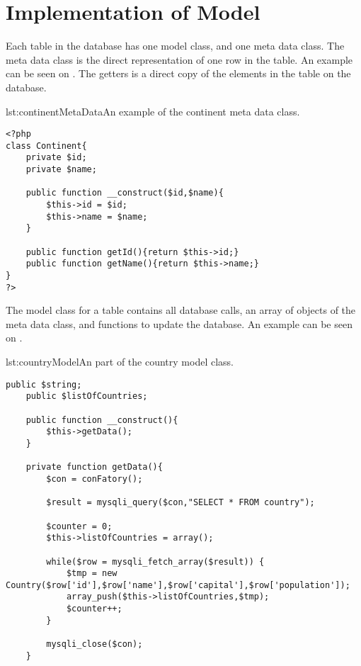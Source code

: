 \section{Implementation of Model}
Each table in the database has one model class, and one meta data class. The meta data class is the direct representation of one row in the table. An example can be seen on . The getters is a direct copy of the elements in the table on the database.

\begin{code}{lst:continentMetaData}{An example of the continent meta data class.}
\begin{lstlisting}
<?php
class Continent{
	private $id;
	private $name;
	
	public function __construct($id,$name){
		$this->id = $id;
		$this->name = $name;
	}
	
	public function getId(){return $this->id;}
	public function getName(){return $this->name;}
}
?>
\end{lstlisting}
\end{code}

The model class for a table contains all database calls, an array of objects of the meta data class, and functions to update the database. An example can be seen on .

\begin{code}{lst:countryModel}{An part of the country model class.}
\begin{lstlisting}
public $string;
	public $listOfCountries;
 
    public function __construct(){
        $this->getData();
    }
	
	private function getData(){
		$con = conFatory();

		$result = mysqli_query($con,"SELECT * FROM country");
		
		$counter = 0;
		$this->listOfCountries = array();
		
		while($row = mysqli_fetch_array($result)) {
			$tmp = new Country($row['id'],$row['name'],$row['capital'],$row['population']);
			array_push($this->listOfCountries,$tmp);
			$counter++;
		}

		mysqli_close($con);
	}
	\end{lstlisting}
	\end{code}